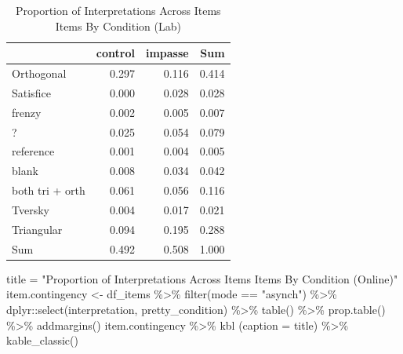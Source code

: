 \documentclass[
  letterpaper,
  DIV=11,
  numbers=noendperiod]{scrreprt}
\newenvironment{Shaded}{\begin{snugshade}}{\end{snugshade}}
\newcommand{\AttributeTok}[1]{\textcolor[rgb]{0.40,0.45,0.13}{#1}}
\newcommand{\FunctionTok}[1]{\textcolor[rgb]{0.28,0.35,0.67}{#1}}
\newcommand{\NormalTok}[1]{\textcolor[rgb]{0.00,0.23,0.31}{#1}}
\newcommand{\OtherTok}[1]{\textcolor[rgb]{0.00,0.23,0.31}{#1}}
\newcommand{\SpecialCharTok}[1]{\textcolor[rgb]{0.37,0.37,0.37}{#1}}
\newcommand{\StringTok}[1]{\textcolor[rgb]{0.13,0.47,0.30}{#1}}
\begin{document}
\begin{table}

\caption{Proportion of Interpretations Across Items Items By Condition (Lab)}
\centering
\begin{tabular}[t]{l|r|r|r}
\hline
  & control & impasse & Sum\\
\hline
Orthogonal & 0.297 & 0.116 & 0.414\\
\hline
Satisfice & 0.000 & 0.028 & 0.028\\
\hline
frenzy & 0.002 & 0.005 & 0.007\\
\hline
? & 0.025 & 0.054 & 0.079\\
\hline
reference & 0.001 & 0.004 & 0.005\\
\hline
blank & 0.008 & 0.034 & 0.042\\
\hline
both tri + orth & 0.061 & 0.056 & 0.116\\
\hline
Tversky & 0.004 & 0.017 & 0.021\\
\hline
Triangular & 0.094 & 0.195 & 0.288\\
\hline
Sum & 0.492 & 0.508 & 1.000\\
\hline
\end{tabular}
\end{table}

\begin{Shaded}
\begin{Highlighting}[]
\NormalTok{title }\OtherTok{=} \StringTok{"Proportion of Interpretations Across Items Items By Condition (Online)"}
\NormalTok{item.contingency }\OtherTok{\textless{}{-}}\NormalTok{ df\_items }\SpecialCharTok{\%\textgreater{}\%} \FunctionTok{filter}\NormalTok{(mode }\SpecialCharTok{==} \StringTok{"asynch"}\NormalTok{) }\SpecialCharTok{\%\textgreater{}\%}\NormalTok{ dplyr}\SpecialCharTok{::}\FunctionTok{select}\NormalTok{(interpretation, pretty\_condition) }\SpecialCharTok{\%\textgreater{}\%} \FunctionTok{table}\NormalTok{() }\SpecialCharTok{\%\textgreater{}\%} \FunctionTok{prop.table}\NormalTok{() }\SpecialCharTok{\%\textgreater{}\%} \FunctionTok{addmargins}\NormalTok{()}
\NormalTok{item.contingency }\SpecialCharTok{\%\textgreater{}\%} \FunctionTok{kbl}\NormalTok{ (}\AttributeTok{caption =}\NormalTok{ title) }\SpecialCharTok{\%\textgreater{}\%} \FunctionTok{kable\_classic}\NormalTok{()}
\end{Highlighting}
\end{Shaded}
\end{document}
